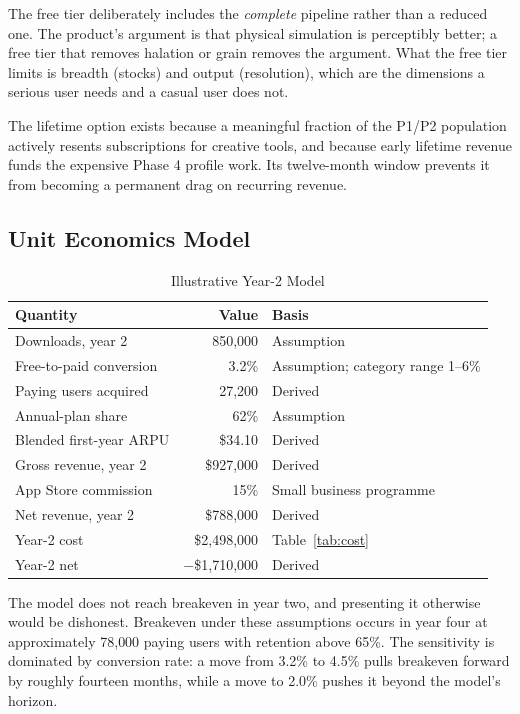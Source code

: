 The free tier deliberately includes the \emph{complete} pipeline rather than a
reduced one. The product's argument is that physical simulation is
perceptibly better; a free tier that removes halation or grain removes the
argument. What the free tier limits is breadth (stocks) and output (resolution),
which are the dimensions a serious user needs and a casual user does not.

The lifetime option exists because a meaningful fraction of the P1/P2 population
actively resents subscriptions for creative tools, and because early lifetime
revenue funds the expensive Phase 4 profile work. Its twelve-month window
prevents it from becoming a permanent drag on recurring revenue.

\subsection{Unit Economics Model}

\begin{table}[htbp]
\caption{Illustrative Year-2 Model}
\label{tab:unitecon}
\begin{center}
\renewcommand{\arraystretch}{1.15}
\begin{tabularx}{\columnwidth}{@{}>{\raggedright\arraybackslash}X r l@{}}
\toprule
\textbf{Quantity} & \textbf{Value} & \textbf{Basis} \\
\midrule
Downloads, year 2 & 850{,}000 & Assumption \\
Free-to-paid conversion & 3.2\% & Assumption; category range 1--6\% \\
Paying users acquired & 27{,}200 & Derived \\
Annual-plan share & 62\% & Assumption \\
Blended first-year ARPU & \$34.10 & Derived \\
Gross revenue, year 2 & \$927{,}000 & Derived \\
App Store commission & 15\% & Small business programme \\
Net revenue, year 2 & \$788{,}000 & Derived \\
Year-2 cost & \$2{,}498{,}000 & Table~\ref{tab:cost} \\
\midrule
Year-2 net & $-$\$1{,}710{,}000 & Derived \\
\bottomrule
\end{tabularx}
\end{center}
\end{table}

The model does not reach breakeven in year two, and presenting it otherwise
would be dishonest. Breakeven under these assumptions occurs in year four at
approximately 78{,}000 paying users with retention above 65\%. The sensitivity
is dominated by conversion rate: a move from 3.2\% to 4.5\% pulls breakeven
forward by roughly fourteen months, while a move to 2.0\% pushes it beyond the
model's horizon.

